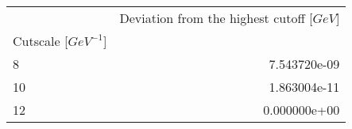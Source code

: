 \begin{tabular}{lr}
\toprule
{} &  Deviation from the highest cutoff [$GeV$] \\
Cutscale [$GeV^{-1}$] &                                            \\
\midrule
8                     &                               7.543720e-09 \\
10                    &                               1.863004e-11 \\
12                    &                               0.000000e+00 \\
\bottomrule
\end{tabular}
